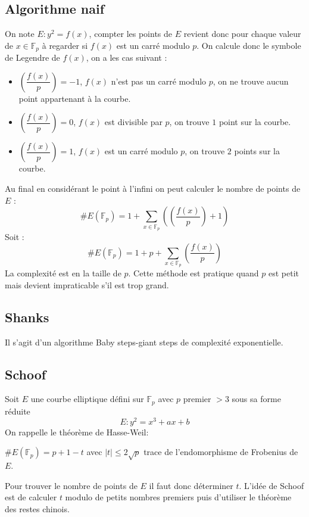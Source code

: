 \documentclass{article}
\begin{document}
\subsection{Algorithme naif}
On note $E: y^2 = f(x)$, compter les points de $E$ revient donc pour chaque valeur de $x \in \mathbb{F}_p$ à regarder si $f(x)$ est un carré modulo $p$. On calcule donc le symbole de Legendre de $f(x)$, on a les cas suivant : 
\begin{itemize}
\item  $\genfrac(){}{0}{f(x)}{p} = -1$, $f(x)$ n'est pas un carré modulo $p$, on ne trouve aucun point appartenant à la courbe.
\item $\genfrac(){}{0}{f(x)}{p} = 0$, $f(x)$ est divisible par $p$, on trouve $1$ point sur la courbe.
\item $\genfrac(){}{0}{f(x)}{p} = 1$, $f(x)$ est un carré modulo $p$, on trouve $2$ points sur la courbe.
\end{itemize}
\medskip
Au final en considérant le point à l'infini on peut calculer le nombre de points de $E$ : 
\begin{equation*}
\#E(\mathbb{F}_p) = 1 + \sum_{x \in \mathbb{F}_p}(\genfrac(){}{0}{f(x)}{p} + 1)
\end{equation*}
Soit : 
\begin{equation}
\#E(\mathbb{F}_p) = 1 + p +\sum_{x \in \mathbb{F}_p}\genfrac(){}{0}{f(x)}{p}
\end{equation}
La complexité est en la taille de $p$. Cette méthode est pratique quand $p$ est petit mais devient impraticable s'il est trop grand.
\subsection{Shanks}
Il s'agit d'un algorithme Baby steps-giant steps de complexité exponentielle.

\subsection{Schoof}
Soit $E$ une courbe elliptique défini sur $\mathbb{F}_p$ avec $p$ premier $>3$ sous sa forme réduite 
$$ E: y^2 = x^3 + ax+b$$
On rappelle le théorème de Hasse-Weil:

\begin{thm}
$\#E(\mathbb{F}_p) = p + 1 - t$ avec $|t| \leq 2 \sqrt{p}$ trace de l'endomorphisme de Frobenius de $E$.
\end{thm}
Pour trouver le nombre de points de $E$ il faut donc déterminer $t$. 
L'idée de Schoof est de calculer $t$ modulo de petits nombres premiers puis d'utiliser le théorème des restes chinois. 
\end{document}
